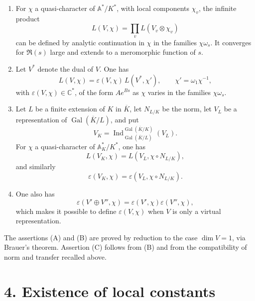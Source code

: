 \documentclass[10pt]{article}
\newcommand{\C}{\mathbb C}
\newcommand{\Gal}{\operatorname{Gal}}
\newcommand{\Ind}{\operatorname{Ind}}
\begin{document}
\begin{enumerate}[label=(\Alph*)]
\item For \(\chi\) a quasi-character of \(\mathbb A^*/K^*\), with local components \(\chi_v\), the infinite product
\[
L(V,\chi)=\prod_vL(V_v\otimes\chi_v)
\]
can be defined by analytic continuation in \(\chi\) in the families \(\chi\omega_s\). It converges for \(\Re(s)\) large and extends to a meromorphic function of \(s\).

\item Let \(V^*\) denote the dual of \(V\). One has
\[
L(V,\chi)=\varepsilon(V,\chi)\,L(V^*,\chi'),
\qquad \chi'=\omega_1\chi^{-1},
\]
with \(\varepsilon(V,\chi)\in\C^*\), of the form \(Ae^{Bs}\) as \(\chi\) varies in the families \(\chi\omega_s\).

\item Let \(L\) be a finite extension of \(K\) in \(\overline K\), let \(N_{L/K}\) be the norm, let \(V_L\) be a representation of \(\Gal(\overline K/L)\), and put
\[
V_K=\Ind_{\Gal(\overline K/L)}^{\Gal(\overline K/K)}(V_L).
\]
For \(\chi\) a quasi-character of \(\mathbb A_K^*/K^*\), one has
\[
L(V_K,\chi)=L(V_L,\chi\circ N_{L/K}),
\]
and similarly
\[
\varepsilon(V_K,\chi)=\varepsilon(V_L,\chi\circ N_{L/K}).
\]
\item One also has
\[
\varepsilon(V'\oplus V'',\chi)=\varepsilon(V',\chi)\varepsilon(V'',\chi),
\]
which makes it possible to define \(\varepsilon(V,\chi)\) when \(V\) is only a virtual representation.
\end{enumerate}
The assertions (A) and (B) are proved by reduction to the case \(\dim V=1\), via Brauer's theorem. Assertion (C) follows from (B) and from the compatibility of norm and transfer recalled above.

\section*{4. Existence of local constants}
\end{document}
